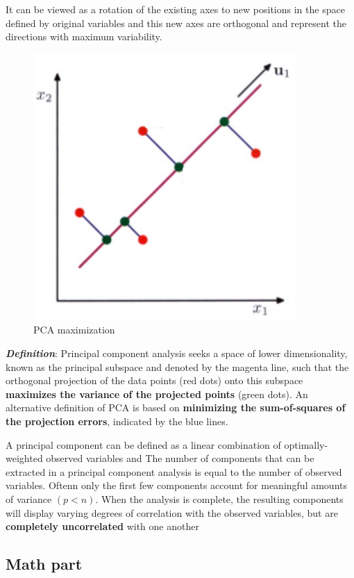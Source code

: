 It can be viewed as a rotation of the existing axes to new positions in the space defined by original variables and this new axes are orthogonal and represent the directions with maximum variability.
\begin{figure}[H]
    \centering
    \includegraphics[scale=0.5]{images/DimRed/PCA3.png}
    \caption{PCA maximization}
    \label{fig:enter-label}
\end{figure}
\emph{\textbf{Definition}}: Principal component analysis seeks a space of lower dimensionality, known as the principal subspace and denoted by the magenta line, such that the orthogonal projection of the data points (red dots) onto this subspace \textbf{maximizes the variance of the projected points} (green dots). An alternative definition of PCA is based on \textbf{minimizing the sum-of-squares of the projection errors}, indicated by the blue lines.


A principal component can be defined as a linear combination of optimally-weighted observed variables and The number of components that can be extracted in a principal component analysis is equal to the number of observed variables. Oftenn only the first few components account for meaningful amounts of variance $(p<n)$. When the analysis is complete, the resulting components will display varying degrees of correlation with the observed variables, but are \textbf{completely uncorrelated} with one another

\subsection{Math part}
